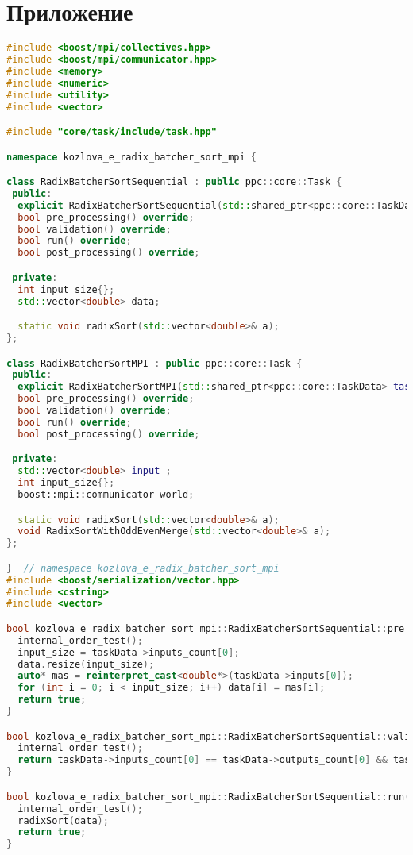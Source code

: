 \documentclass[a4paper,12pt]{article}
\begin{document}
\section*{\centering Приложение}
\begin{lstlisting}[language=C++,caption={Код программы}]
#include <boost/mpi/collectives.hpp>
#include <boost/mpi/communicator.hpp>
#include <memory>
#include <numeric>
#include <utility>
#include <vector>

#include "core/task/include/task.hpp"

namespace kozlova_e_radix_batcher_sort_mpi {

class RadixBatcherSortSequential : public ppc::core::Task {
 public:
  explicit RadixBatcherSortSequential(std::shared_ptr<ppc::core::TaskData> taskData_) : Task(std::move(taskData_)) {}
  bool pre_processing() override;
  bool validation() override;
  bool run() override;
  bool post_processing() override;

 private:
  int input_size{};
  std::vector<double> data;

  static void radixSort(std::vector<double>& a);
};

class RadixBatcherSortMPI : public ppc::core::Task {
 public:
  explicit RadixBatcherSortMPI(std::shared_ptr<ppc::core::TaskData> taskData_) : Task(std::move(taskData_)) {}
  bool pre_processing() override;
  bool validation() override;
  bool run() override;
  bool post_processing() override;

 private:
  std::vector<double> input_;
  int input_size{};
  boost::mpi::communicator world;

  static void radixSort(std::vector<double>& a);
  void RadixSortWithOddEvenMerge(std::vector<double>& a);
};

}  // namespace kozlova_e_radix_batcher_sort_mpi
#include <boost/serialization/vector.hpp>
#include <cstring>
#include <vector>

bool kozlova_e_radix_batcher_sort_mpi::RadixBatcherSortSequential::pre_processing() {
  internal_order_test();
  input_size = taskData->inputs_count[0];
  data.resize(input_size);
  auto* mas = reinterpret_cast<double*>(taskData->inputs[0]);
  for (int i = 0; i < input_size; i++) data[i] = mas[i];
  return true;
}

bool kozlova_e_radix_batcher_sort_mpi::RadixBatcherSortSequential::validation() {
  internal_order_test();
  return taskData->inputs_count[0] == taskData->outputs_count[0] && taskData->inputs_count[0] >= 0;
}

bool kozlova_e_radix_batcher_sort_mpi::RadixBatcherSortSequential::run() {
  internal_order_test();
  radixSort(data);
  return true;
}


\end{lstlisting}
\end{document}

